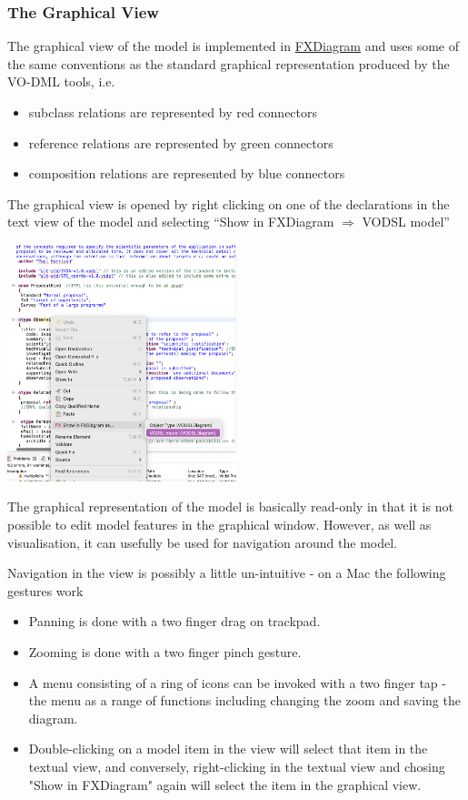 \documentclass[11pt,a4paper]{ivoa}
\begin{document}
\subsubsection{The Graphical View}
 
The graphical view of the model is implemented in \href{http://jankoehnlein.github.io/FXDiagram/}{FXDiagram} and uses some of the same
conventions as the standard graphical representation produced by the VO-DML tools, i.e.\ 
\begin{itemize}
  \item subclass relations are represented by red connectors
  \item reference relations are represented by green connectors
  \item composition relations are represented by blue connectors
\end{itemize}

The graphical view is opened by right clicking on one of the 
declarations in the text view of the model and selecting ``Show in FXDiagram $\Rightarrow$ VODSL model''

\includegraphics[width=0.5\textwidth]{launchfxdiagram.png}
 
The graphical representation of the model is basically read-only in that it is not possible to edit model features in the graphical window. 
However, as well as visualisation,
it can usefully be used for navigation around the model.


Navigation in the view is possibly a little un-intuitive - on a Mac the following gestures work
\begin{itemize}
\item Panning is done with a two finger drag on trackpad.
\item Zooming is done with a two finger pinch gesture.
\item A menu consisting of a ring of icons can be invoked with a two finger tap - the menu as a range of functions including changing the zoom and saving the diagram.
\item Double-clicking on a model item in the view will select that item in the textual view, 
and conversely, right-clicking in the textual view and chosing "Show in FXDiagram" again will select the item in the graphical view.
\end{itemize}
\end{document}
